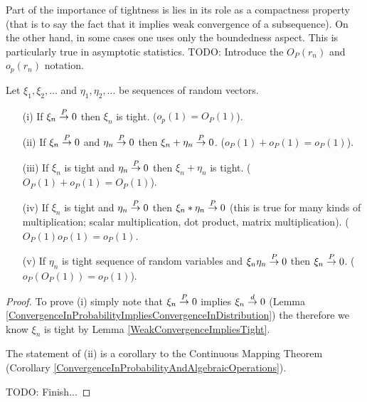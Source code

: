 Part of the importance of tightness is lies in its role as a
compactness property (that is to say the fact that it implies weak
convergence of a subsequence).  On the other hand, in some cases one
uses only the boundedness aspect.  This is particularly true in
asymptotic statistics.  TODO: Introduce the $O_P(r_n)$ and $o_p(r_n)$
notation.
\begin{lem}\label{AlgebraOfStochasticConvergence}Let $\xi_1,
  \xi_2, \dots$ and
  $\eta_1, \eta_2, \dots$ be sequences of random vectors.
\begin{itemize}
\item[(i)]If $\xi_n \overset{P}\to 0$ then $\xi_n$ is tight. ($o_p(1) = O_P(1)$).
\item[(ii)]If $\xi_n \overset{P}\to 0$ and $\eta_n \overset{P}\to 0$ then $\xi_n +
  \eta_n \overset{P}\to 0$.  ($o_P(1) + o_P(1) = o_P(1)$).
\item[(iii)]If $\xi_n$ is tight and $\eta_n \overset{P}\to 0$ then $\xi_n +
  \eta_n$ is tight.  ($O_P(1) + o_P(1) = O_P(1)$).
\item[(iv)]If $\xi_n$ is tight and $\eta_n \overset{P}\to 0$ then $\xi_n *
  \eta_n \overset{P}\to 0$ (this is true for many kinds of multiplication;
  scalar multiplication, dot product, matrix multiplication). ($O_P(1)
  o_P(1) = o_P(1)$.
\item[(v)]If $\eta_n$ is tight sequence of random variables and
  $\xi_n \eta_n \overset{P}\to 0$ then $\xi_n \overset{P}\to 0$. ($o_P(O_P(1)) = o_P(1)$).
\end{itemize}
\end{lem}
\begin{proof}
To prove (i) simply note that $\xi_n \overset{P}\to 0$ implies $\xi_n
\overset{d}\to 0$ (Lemma
\ref{ConvergenceInProbabilityImpliesConvergenceInDistribution}) the
therefore we know $\xi_n$ is tight by Lemma
\ref{WeakConvergenceImpliesTight}.

The statement of (ii) is a corollary to the Continuous Mapping Theorem
(Corollary \ref{ConvergenceInProbabilityAndAlgebraicOperations}).

TODO: Finish...
\end{proof}

